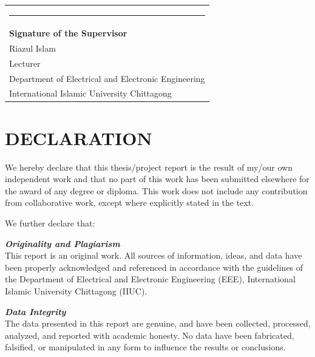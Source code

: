 \documentclass[12pt,a4paper,oneside]{report}
\begin{document}
\vspace{0.6cm}

\noindent

\vspace{0.8cm}

\noindent
\begin{tabular}{l}
    \rule{6cm}{0.4pt} \\[0.2cm]
    \textbf{Signature of the Supervisor} \\[0.2cm]
    Riazul Islam \\
    Lecturer \\
    Department of Electrical and Electronic Engineering \\
    International Islamic University Chittagong
\end{tabular}

\clearpage

\chapter*{DECLARATION}

\noindent We hereby declare that this thesis/project report is the result of my/our own independent work and that no part of this work has been submitted elsewhere for the award of any degree or diploma. This work does not include any contribution from collaborative work, except where explicitly stated in the text.

\vspace{0.15cm}
\noindent We further declare that:

\vspace{0.15cm}
\noindent\textbf{\textit{Originality and Plagiarism}}\\
This report is an original work. All sources of information, ideas, and data have been properly acknowledged and referenced in accordance with the guidelines of the Department of Electrical and Electronic Engineering (EEE), International Islamic University Chittagong (IIUC).

\vspace{0.15cm}
\noindent\textbf{\textit{Data Integrity}}\\
The data presented in this report are genuine, and have been collected, processed, analyzed, and reported with academic honesty. No data have been fabricated, falsified, or manipulated in any form to influence the results or conclusions.
\end{document}
